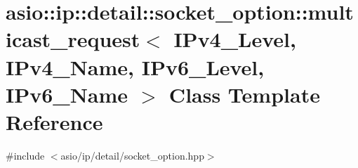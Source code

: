 \hypertarget{classasio_1_1ip_1_1detail_1_1socket__option_1_1multicast__request}{}\section{asio\+:\+:ip\+:\+:detail\+:\+:socket\+\_\+option\+:\+:multicast\+\_\+request$<$ I\+Pv4\+\_\+\+Level, I\+Pv4\+\_\+\+Name, I\+Pv6\+\_\+\+Level, I\+Pv6\+\_\+\+Name $>$ Class Template Reference}
\label{classasio_1_1ip_1_1detail_1_1socket__option_1_1multicast__request}


{\ttfamily \#include $<$asio/ip/detail/socket\+\_\+option.\+hpp$>$}

